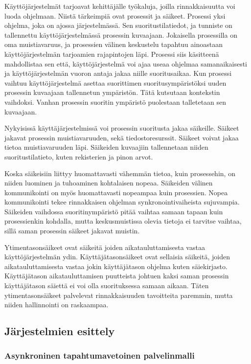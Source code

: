 \documentclass[12pt]{article}
\begin{document}
Käyttöjärjestelmät tarjoavat kehittäjälle työkaluja, joilla rinnakkaisuutta
voi luoda ohjelmaan. Niistä tärkeimpiä ovat prosessit ja säikeet.
Prosessi yksi ohjelma, joka on ajossa järjestelmässä. Sen suoritustilatiedot, ja tunniste on
tallennettu käyttöjärjestelmässä prosessin kuvaajaan. Jokaisella
prosessilla on oma muistiavaruus, ja prosessien välinen keskustelu
tapahtuu ainoastaan käyttöjärjestelmän tarjoamien rajapintojen läpi.
Prosessi siis käsitteenä mahdollistaa sen että, käyttöjärjestelmä
voi ajaa useaa ohjelmaa samanaikaisesti ja käyttöjärjestelmän
vuoron antaja jakaa niille suoritusaikaa. Kun prosessi vaihtuu
käyttöjärjestelmä asettaa suorittimen suoritusympäristöksi
uuden prosessin kuvaajaan tallennetun ympäristön. Tätä kutsutaan kontekstin
vaihdoksi. Vanhan prosessin suoritin ympäristö puolestaan talletetaan sen 
kuvaajaan.

Nykyisissä käyttäjärjestelmissä voi prosessin suoritusta jakaa
säikeille. Säikeet jakavat prosessin muistiavaruuden, sekä tiedostoresurssit.
Säikeet voivat jakaa tietoa muistiavaruuden läpi. Säikeiden kuvaajiin
tallennetaan niiden suoritustilatieto, kuten rekisterien ja pinon arvot.

Koska säikeisiin liittyy huomattavasti vähemmän tietoa, kuin prosessehin,
on niiden luominen ja tuhoaminen kohtalaisen nopeaa. Säikeiden välinen
kommunikointi on myös huomattavasti nopeampaa kuin prosessien. Nopea
kommunikointi tekee rinnakkaisen ohjelman synkronointivaiheista
sujuvampia. Säikeiden vaihdossa suoritinympäristö pitää vaihtaa 
samaan tapaan kuin prosessienkin kohdalla, mutta keskusmuistissa olevia
tietoja ei tarvitse vaihtaa, sillä saman prosessin säikeet jakavat
muistin.

Ytimentasonsäikeet ovat säikeitä joiden aikatauluttamisesta vastaa
käyttöjärjestelmän ydin. Käyttäjätasonsäikeet ovat sellaisia säikeitä,
joiden aikatauluttamisesta vastaa jokin käyttäjätason ohjelma kuten
säiekirjasto. Käyttäjätason aikatauluttamisen puutteista johtuen
kaksi saman prosessin käyttäjätason säiettä ei voi olla suorituksessa
samaan aikaan. Täten ytimentasonsäikeet palvelevat rinnakkaisuuden tavoitteita
paremmin, mutta niiden hallinnointi on raskaampaa.
\subsection{Järjestelmien esittely}

\subsubsection{Asynkroninen tapahtumavetoinen palvelinmalli}
\end{document}
